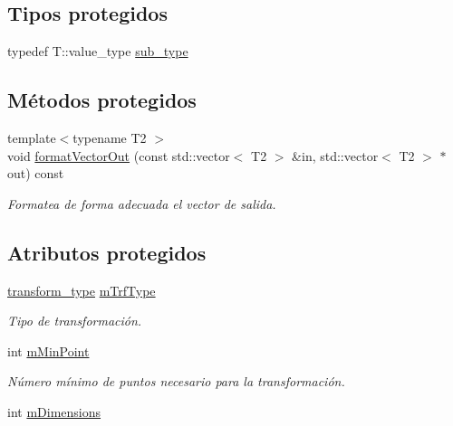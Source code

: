 \subsection*{Tipos protegidos}
\begin{DoxyCompactItemize}
\item 
typedef T\+::value\+\_\+type \hyperlink{class_i3_d_1_1_transform_ac087b4b8b9acb1b11a6caa2231d598c7}{sub\+\_\+type}
\end{DoxyCompactItemize}
\subsection*{Métodos protegidos}
\begin{DoxyCompactItemize}
\item 
{\footnotesize template$<$typename T2 $>$ }\\void \hyperlink{class_i3_d_1_1_transform_aa4d27a52571d16156699589050ffd7fc}{format\+Vector\+Out} (const std\+::vector$<$ T2 $>$ \&in, std\+::vector$<$ T2 $>$ $\ast$out) const 
\begin{DoxyCompactList}\small\item\em Formatea de forma adecuada el vector de salida. \end{DoxyCompactList}\end{DoxyCompactItemize}
\subsection*{Atributos protegidos}
\begin{DoxyCompactItemize}
\item 
\hyperlink{group__trf_group_ga175e1580b1ecbc0710ad48060d56c2a3}{transform\+\_\+type} \hyperlink{class_i3_d_1_1_transform_a1d5c0d6ea45417608b00316a08f164d7}{m\+Trf\+Type}
\begin{DoxyCompactList}\small\item\em Tipo de transformación. \end{DoxyCompactList}\item 
int \hyperlink{class_i3_d_1_1_transform_a087716ea2e7fa31127003e50479ed01e}{m\+Min\+Point}
\begin{DoxyCompactList}\small\item\em Número mínimo de puntos necesario para la transformación. \end{DoxyCompactList}\item 
int \hyperlink{class_i3_d_1_1_transform_a53fc627243795344379b92d0a48a31a9}{m\+Dimensions}
\end{DoxyCompactItemize}



